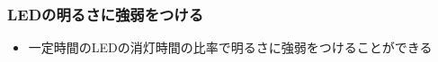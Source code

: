 \begin{frame}
    \frametitle{LEDの明るさに強弱をつける}
    \begin{center}
        \begin{figure}
            
        \end{figure}
        \begin{itemize}
            \item 一定時間のLEDの消灯時間の比率で明るさに強弱をつけることができる
        \end{itemize}
    \end{center}
\end{frame}
